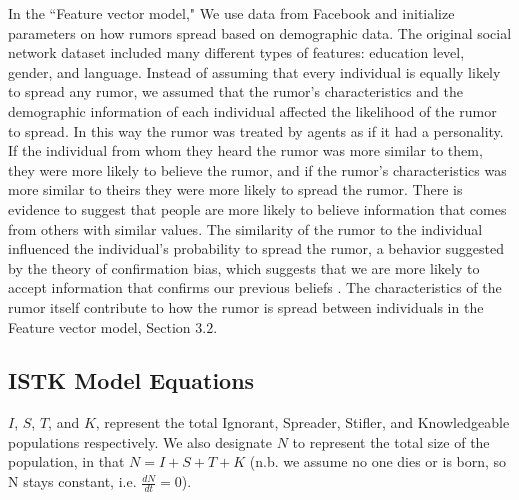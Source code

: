  In the ``Feature vector model," We use data from Facebook and initialize parameters on how rumors spread based on demographic data. The original social network dataset included many different types of features: education level, gender, and language. Instead of assuming that every individual is equally likely to spread any rumor, we assumed that the rumor's characteristics and the demographic information of each individual affected the likelihood of the rumor to spread. In this way the rumor was treated by agents as if it had a personality. If the individual from whom they heard the rumor was more similar to them, they were more likely to believe the rumor, and if the rumor's characteristics was more similar to theirs they were more likely to spread the rumor. There is evidence to suggest that people are more likely to believe information that comes from others with similar values\cite{gillespie-2004}. The similarity of the rumor to the individual influenced the individual's probability to spread the rumor, a behavior suggested by the theory of confirmation bias, which suggests that we are more likely to accept information that confirms our previous beliefs \cite{wason-1960}. The characteristics of the rumor itself contribute to how the rumor is spread between individuals in the Feature vector model, Section $3.2$.
            
\subsection{ISTK Model Equations}
\label{subsec:istkeqns}


\noindent $ I $, $ S $, $ T $, and $ K $, represent the total Ignorant, Spreader, Stifler, and Knowledgeable populations respectively. We also designate $ N $ to represent the total size of the population, in that $ N = I + S + T + K $ (n.b. we assume no one dies or is born, so N stays constant, i.e. $\frac{dN}{dt} = 0$).

